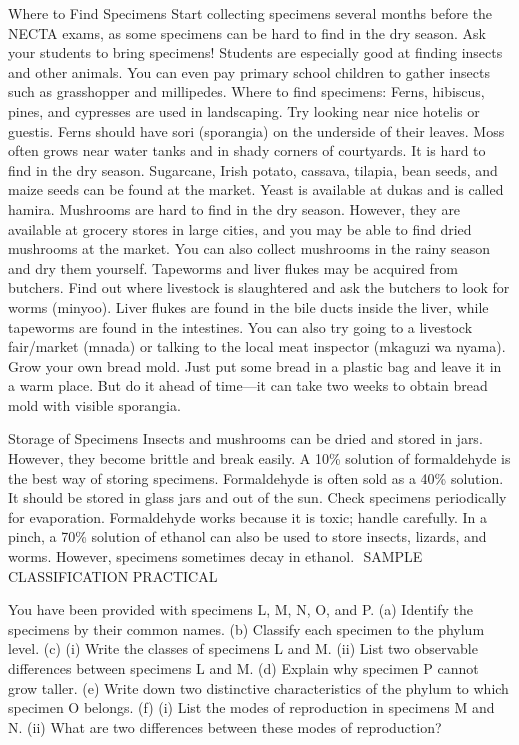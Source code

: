\begin{enumerate}
Where to Find Specimens
Start collecting specimens several months before the NECTA exams, as some specimens can be hard to find in the dry season.
Ask your students to bring specimens! Students are especially good at finding insects and other animals. You can  even pay primary school children to gather insects such as grasshopper and millipedes. 
Where to find specimens:
Ferns, hibiscus, pines, and cypresses are used in landscaping. Try looking near nice hotelis or guestis. Ferns should have sori (sporangia) on the underside of their leaves.
Moss often grows near water tanks and in shady corners of courtyards. It is hard to find in the dry season.
Sugarcane, Irish potato, cassava, tilapia, bean seeds, and maize seeds can be found at the market. Yeast is available at dukas and is called hamira. 
Mushrooms are hard to find in the dry season. However, they are available at grocery stores in large cities, and you may be able to find dried mushrooms at the market. You can also collect mushrooms in the rainy season and dry them yourself.
Tapeworms and liver flukes may be acquired from butchers. Find out where livestock is slaughtered and ask the butchers to look for worms (minyoo). Liver flukes are found in the bile ducts inside the liver, while tapeworms are found in the intestines. You can also try going to a livestock fair/market (mnada) or talking to the local meat inspector (mkaguzi wa nyama).
Grow your own bread mold. Just put some bread in a plastic bag and leave it in a warm place. But do it ahead of time—it can take two weeks to obtain bread mold with visible sporangia.

Storage of Specimens
	Insects and mushrooms can be dried and stored in jars. However, they become brittle and break easily.
	A 10\% solution of formaldehyde is the best way of storing specimens. Formaldehyde is often sold as a 40\% solution. It should be stored in glass jars and out of the sun. Check specimens periodically for evaporation. Formaldehyde works because it is toxic; handle carefully.
	In a pinch, a 70\% solution of ethanol can also be used to store insects, lizards, and worms. However, specimens sometimes decay in ethanol. 
­­
SAMPLE CLASSIFICATION PRACTICAL

You have been provided with specimens L, M, N, O, and P.
(a) Identify the specimens by their common names.
(b) Classify each specimen to the phylum level.	
(c) 	(i) Write the classes of specimens L and M.
(ii) List two observable differences between specimens L and M.
(d) Explain why specimen P cannot grow taller.
(e) Write down two distinctive characteristics of the phylum to which specimen O belongs.
(f) 	(i) List the modes of reproduction in specimens M and N.
(ii) What are two differences between these modes of reproduction?


\end{enumerate}
